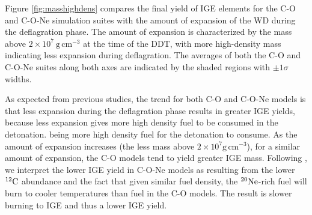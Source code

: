 \documentclass[iop,apj]{emulateapj}
\newcommand{\C}[1]{\ensuremath{{}^{#1}{\rm C}}}
\newcommand{\Ne}[1]{\ensuremath{{}^{#1}{\rm Ne}}}
\newcommand{\unitspace}{\ensuremath{\,}}
\newcommand{\usp}{\unitspace}
\newcommand{\unitstyle}[1]{\ensuremath{\mathrm{#1}}}
\newcommand{\power}[2]{\ensuremath{{#1}^{#2}}}
\newcommand{\centi}{\unitstyle{c}}
\newcommand{\meter}{\unitstyle{m}}
\newcommand{\cm}{\centi\meter}
\newcommand{\gram}{\unitstyle{g}}
\newcommand{\grampercc}{\gram\usp\power{\cm}{-3}} %
\begin{document}
Figure \ref{fig:masshighdens} compares the final yield of IGE elements
for the C-O and C-O-Ne simulation suites with the amount of expansion of the
WD during the deflagration phase. The amount of expansion is 
characterized by the mass above $2 \times 10^7~\grampercc$ at the 
time of the DDT, with more high-density mass
indicating less expansion during deflagration. The averages of both
the C-O and C-O-Ne suites along both axes are indicated by the shaded
regions with $\pm1\sigma$ widths. 

As expected from previous studies, the trend for both C-O and C-O-Ne
models is that less expansion during the deflagration phase results in
greater IGE yields, because less expansion gives more high
density fuel to be consumed in the detonation.
being more high density fuel for the detonation to consume. 
As the amount of expansion increases (the less
mass above $2 \times 10^7 \grampercc$), 
for a similar amount of expansion, the C-O
models tend to yield greater IGE mass. Following 
\citet{willcoxetal2016}, we interpret
the lower IGE yield in C-O-Ne models as resulting 
from the lower \C{12} abundance and the fact that given
similar fuel density, the \Ne{20}-rich fuel will burn to cooler
temperatures than fuel in the C-O models. The result is
slower burning to IGE and thus a lower IGE yield.
\end{document}
